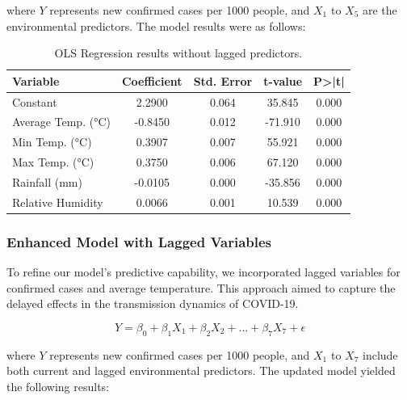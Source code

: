 \documentclass[sigconf,screen,nonacm]{acmart}
\begin{document}
where \( Y \) represents new confirmed cases per 1000 people, and \( X_1 \) to \( X_5 \) are the environmental predictors. The model results were as follows:

\begin{table}[H]
\centering
\caption{OLS Regression results without lagged predictors.}
\label{tab:regression_results_initial}
\begin{tabular}{lcccc}
\hline
\textbf{Variable} & \textbf{Coefficient} & \textbf{Std. Error} & \textbf{t-value} & \textbf{P>|t|} \\
\hline
Constant & 2.2900 & 0.064 & 35.845 & 0.000 \\
Average Temp. (°C) & -0.8450 & 0.012 & -71.910 & 0.000 \\
Min Temp. (°C) & 0.3907 & 0.007 & 55.921 & 0.000 \\
Max Temp. (°C) & 0.3750 & 0.006 & 67.120 & 0.000 \\
Rainfall (mm) & -0.0105 & 0.000 & -35.856 & 0.000 \\
Relative Humidity & 0.0066 & 0.001 & 10.539 & 0.000 \\
\hline
\end{tabular}
\end{table}

\subsubsection{Enhanced Model with Lagged Variables}
To refine our model's predictive capability, we incorporated lagged variables for confirmed cases and average temperature. This approach aimed to capture the delayed effects in the transmission dynamics of COVID-19.

\begin{equation}
Y = \beta_0 + \beta_1X_1 + \beta_2X_2 + ... + \beta_7X_7 + \epsilon
\end{equation}

where \( Y \) represents new confirmed cases per 1000 people, and \( X_1 \) to \( X_7 \) include both current and lagged environmental predictors. The updated model yielded the following results:
\end{document}
